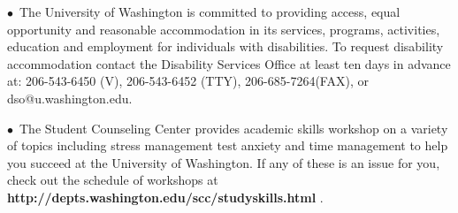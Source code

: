 \documentclass[11 pt]{report}
\begin{document}
\vspace{.2cm}

\noindent $\bullet$\ The University of Washington is committed to providing
access, equal opportunity and reasonable accommodation in its
services, programs, activities, education and employment for
individuals with disabilities.  To request disability accommodation
contact the Disability Services Office at least ten days in advance
at: 206-543-6450 (V), 206-543-6452 (TTY), 206-685-7264(FAX), or
dso@u.washington.edu.

\vspace{.2cm}

\noindent $\bullet$\  The Student Counseling Center provides academic skills
workshop on a variety of topics including stress management test
anxiety and time management to help you succeed at the University of
Washington. If any of these is an issue for you, check out the
schedule of workshops at {\bf
http://depts.washington.edu/scc/studyskills.html} .
\end{document}
